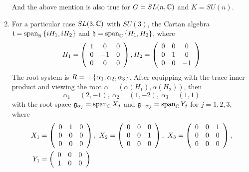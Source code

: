 \documentclass[a4paper,12pt]{article}
\begin{document}
\begin{exam}
\begin{enumerate}
			And the above mention is also true for $G = SL(n,\mathbb{C})$ and $K = SU(n)$.
			\item For a particular case $SL(3,\mathbb{C})$ with $SU(3)$, the Cartan algebra $\mathfrak{t} = \operatorname{span}_{\mathbb{R}}\left\{iH_1,iH_2\right\}$ and $\mathfrak{h} = \operatorname{span}_{\mathbb{C}}\left\{H_1,H_2\right\}$, where
			\begin{equation*}
			 	H_1 = \left(
					\begin{array}{ccc}
						1 & 0 & 0\\
						0 & -1 &  0 \\
						0 & 0 & 0
					\end{array}
				\right),H_2 = \left(
					\begin{array}{ccc}
						0 & 0 & 0\\
						0 & 1 &  0 \\
						0 & 0 & -1
					\end{array}
				\right)
			\end{equation*}
			The root system is $R = \pm \left\{\alpha_1,\alpha_2,\alpha_3\right\}$. After equipping with the trace inner product and viewing the root $\alpha = (\alpha(H_1),\alpha(H_2))$, then
			\begin{equation*}
				\alpha_1 = (2,-1),~\alpha_2 = (1,-2),~\alpha_3 = (1,1)
			\end{equation*}
			with the root space $\mathfrak{g}_{\alpha_j} = \operatorname{span}_{\mathbb{C}}X_j$ and $\mathfrak{g}_{-\alpha_j} = \operatorname{span}_{\mathbb{C}}Y_j$ for $j=1,2,3$, where
			\begin{equation*}
				\begin{split}
					X_1 &= \left(
					\begin{array}{ccc}
						0 & 1 & 0\\
						0 & 0 & 0 \\
						0 & 0 & 0
					\end{array}
				\right),~X_2 = \left(
					\begin{array}{ccc}
						0 & 0 & 0\\
						0 & 0 & 1 \\
						0 & 0 & 0
					\end{array}
					\right),~X_3 = \left(
					\begin{array}{ccc}
						0 & 0 & 1\\
						0 & 0 & 0 \\
						0 & 0 & 0
					\end{array}
					\right), \\
					Y_1 &= \left(
					\begin{array}{ccc}
						0 & 0 & 0\\
						1 & 0 &  0 \\

\end{array}\right)
\end{split}
\end{equation*}
\end{enumerate}
\end{exam}
\end{document}
